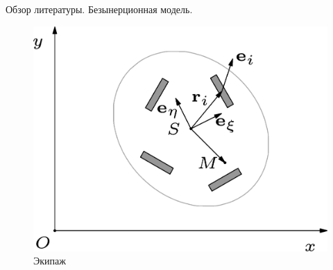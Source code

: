 \begin{myposter}{
    Обзор литературы. Безынерционная модель.
}
{{\begin{figure}[H]
                    \includegraphics[width=\textwidth]{content/pic/asypng/cart_bor.png}
                    \caption{Экипаж}
                    \label{fig:bor_vehicle}
                \endminipage
            \end{figure}
            \vspace{10pt}
        }
    }

\end{myposter}
